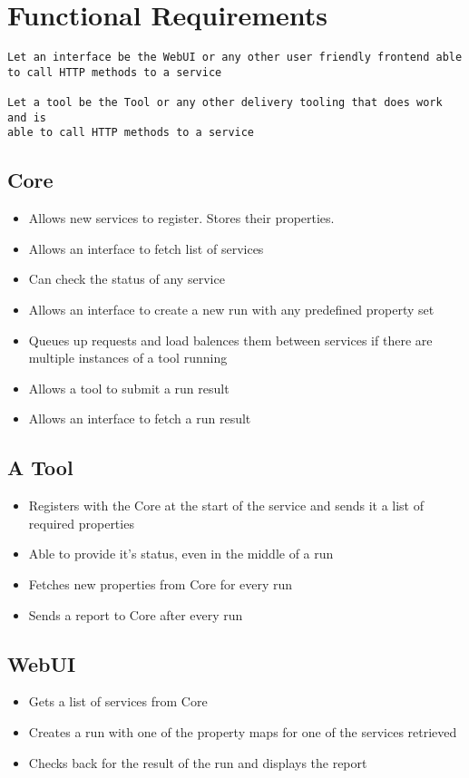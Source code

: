 \documentclass[12pt]{article}
\begin{document}
\section{Functional Requirements}\label{functional-requirements}

\begin{verbatim}
Let an interface be the WebUI or any other user friendly frontend able 
to call HTTP methods to a service

Let a tool be the Tool or any other delivery tooling that does work and is 
able to call HTTP methods to a service
\end{verbatim}

\subsection{Core}\label{core}

\begin{itemize}
\item
  Allows new services to register. Stores their properties.
\item
  Allows an interface to fetch list of services
\item
  Can check the status of any service
\item
  Allows an interface to create a new run with any predefined property
  set
\item
  Queues up requests and load balences them between services if there
  are multiple instances of a tool running
\item
  Allows a tool to submit a run result
\item
  Allows an interface to fetch a run result
\end{itemize}

\subsection{A Tool}\label{a-tool}

\begin{itemize}
\item
  Registers with the Core at the start of the service and sends it a
  list of required properties
\item
  Able to provide it's status, even in the middle of a run
\item
  Fetches new properties from Core for every run
\item
  Sends a report to Core after every run
\end{itemize}

\subsection{WebUI}\label{webui}

\begin{itemize}
\item
  Gets a list of services from Core
\item
  Creates a run with one of the property maps for one of the services
  retrieved
\item
  Checks back for the result of the run and displays the report
\end{itemize}



\end{document}
